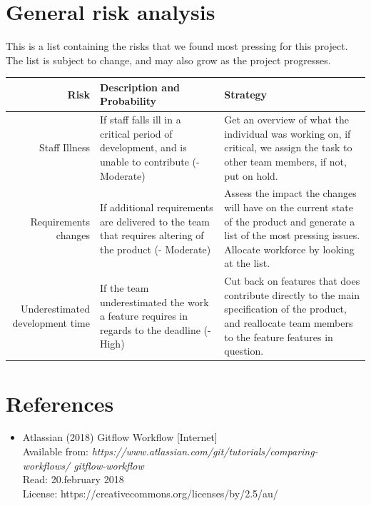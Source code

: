 \documentclass[12pt]{article}%
\begin{document}
\section{General risk analysis}
This is a list containing the risks that we found most pressing for this project. The list is subject to change, and may also grow as the project progresses.
\vspace{5mm}

\begin{tabularx}{\linewidth}{ r X X }
\hline
Risk & Description and Probability & Strategy \\ \hline

Staff Illness 
& If staff falls ill in a critical period of development, and is unable to contribute (- Moderate)
& Get an overview of what the individual was working on, if critical, we assign the task to other team members, if not, put on hold.\\

Requirements changes        
&If additional requirements are delivered to the team that requires altering of the product (- Moderate)
& Assess the impact the changes will have on the current state of the product and generate a list of the most pressing issues. Allocate workforce by looking at the list.\\ \hline
Underestimated development time
&If the team underestimated the work a feature requires in regards to the deadline (- High)                         
& Cut back on features that does contribute directly to the main specification of the product, and reallocate team members to the feature features in question.                 \\ \hline
\end{tabularx}

\vspace{30mm}
\section{References}
\begin{itemize}
\item Atlassian (2018) Gitflow Workflow [Internet] \\
	  Available from: \textit{https://www.atlassian.com/git/tutorials/comparing-workflows/
	  gitflow-workflow} \\
	  Read: 20.february 2018\\
	  License: https://creativecommons.org/licenses/by/2.5/au/
\end{itemize}
\end{document}
